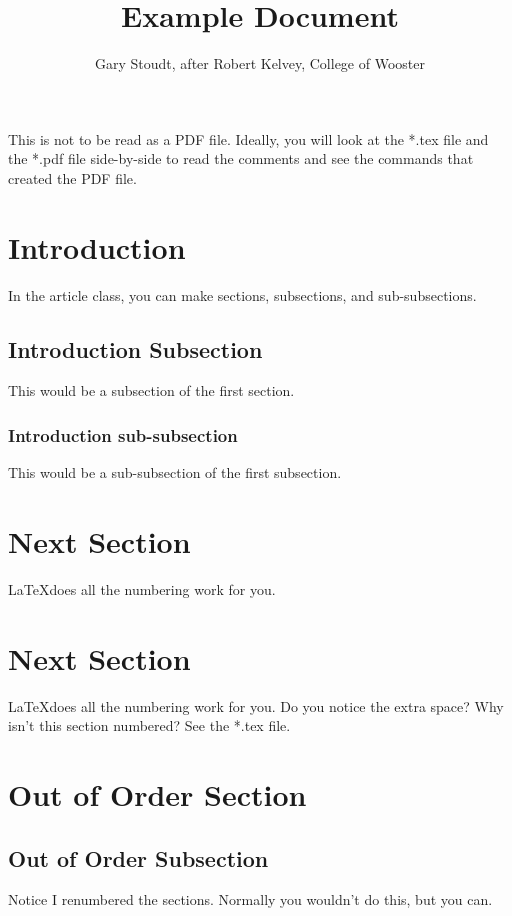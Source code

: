 \documentclass[12pt]{article}
\theoremstyle{definition}
\begin{document}
\title{Example Document}

\author{Gary Stoudt, after Robert Kelvey, College of Wooster}
\maketitle %
This is not to be read as a PDF file.  Ideally, you will look at the *.tex file and the *.pdf file side-by-side to read the comments and see the commands that created the PDF file.
\section{Introduction} In the article class, you can make sections, subsections, and sub-subsections.

\subsection{Introduction Subsection}  This would be a subsection of the first section.

\subsubsection{Introduction sub-subsection} This would be a sub-subsection of the first subsection.

\section{Next Section} \LaTeX does all the numbering work for you.
\section*{Next Section} \LaTeX \thinspace does all the numbering work for you.  Do you notice the extra space?  Why isn't this section numbered?  See the *.tex file.
\setcounter{section}{5}
\section{Out of Order Section}
\setcounter{subsection}{3}
\subsection{Out of Order Subsection}
Notice I renumbered the sections.  Normally you wouldn't do this, but you can.
\setcounter{section}{2}%
\end{document}
